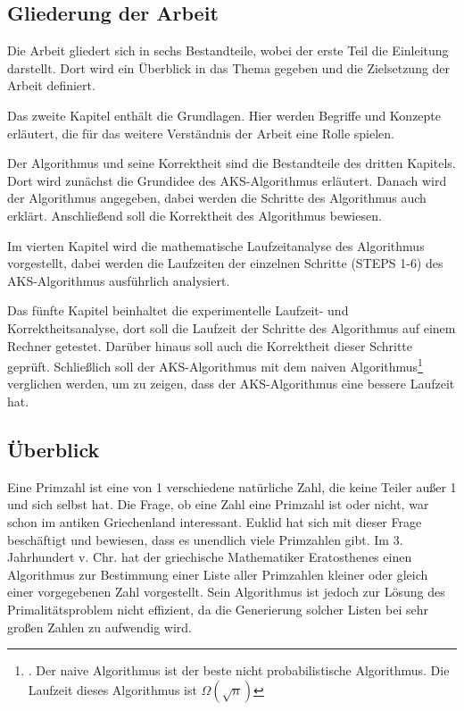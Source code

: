 \documentclass[12pt,oneside]{article}
\theoremstyle{remark}
\theoremstyle{definition}
\begin{document}
\subsection{Gliederung der Arbeit}
Die Arbeit gliedert sich in sechs Bestandteile, wobei der
erste Teil die Einleitung darstellt. Dort wird ein Überblick in das Thema gegeben und die Zielsetzung der Arbeit definiert.

Das zweite Kapitel enthält die Grundlagen. Hier werden Begriffe und Konzepte erläutert, die für das weitere Verständnis der Arbeit eine Rolle spielen. 

Der Algorithmus und seine Korrektheit sind die Bestandteile des dritten Kapitels. Dort wird zunächst die Grundidee des AKS-Algorithmus erläutert. Danach wird der Algorithmus angegeben, dabei werden die Schritte des Algorithmus auch erklärt. Anschließend soll die Korrektheit des Algorithmus bewiesen. 

Im vierten Kapitel wird die mathematische Laufzeitanalyse des Algorithmus vorgestellt, dabei werden die Laufzeiten der einzelnen Schritte (STEPS 1-6) des AKS-Algorithmus ausführlich analysiert.

Das fünfte Kapitel beinhaltet die experimentelle Laufzeit- und Korrektheitsanalyse, dort  soll die Laufzeit der Schritte des Algorithmus auf einem Rechner getestet. Darüber hinaus soll auch die Korrektheit dieser Schritte geprüft. Schließlich soll der AKS-Algorithmus mit dem naiven Algorithmus\footnote{. Der naive Algorithmus ist der beste nicht probabilistische Algorithmus. Die Laufzeit dieses Algorithmus ist $\Omega(\sqrt{n})$} verglichen werden, um zu zeigen, dass der AKS-Algorithmus eine bessere Laufzeit hat.  

\subsection{Überblick}
Eine Primzahl ist eine von 1 verschiedene natürliche Zahl, die keine Teiler außer 1 und sich selbst hat. Die Frage, ob eine Zahl eine Primzahl ist oder nicht, war schon im antiken Griechenland interessant. Euklid hat sich mit dieser Frage beschäftigt und bewiesen, dass es unendlich viele Primzahlen gibt. Im 3. Jahrhundert v. Chr. hat der griechische Mathematiker Eratosthenes einen Algorithmus zur Bestimmung einer Liste aller Primzahlen kleiner oder gleich einer vorgegebenen Zahl vorgestellt. Sein Algorithmus ist jedoch zur Lösung des Primalitätsproblem nicht effizient, da die Generierung solcher Listen bei sehr großen Zahlen zu aufwendig wird.
\end{document}
